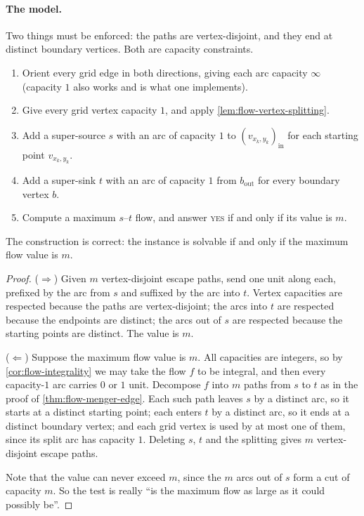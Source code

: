 \paragraph{The model.}
Two things must be enforced: the paths are vertex-disjoint, and they end at
distinct boundary vertices. Both are capacity constraints.

\begin{enumerate}[leftmargin=*]
  \item Orient every grid edge in both directions, giving each arc capacity
        $\infty$ (capacity $1$ also works and is what one implements).
  \item Give every grid vertex capacity $1$, and apply
        \cref{lem:flow-vertex-splitting}.
  \item Add a super-source $s$ with an arc of capacity $1$ to
        $(v_{x_k,y_k})_{\mathrm{in}}$ for each starting point $v_{x_k,y_k}$.
  \item Add a super-sink $t$ with an arc of capacity $1$ from
        $b_{\mathrm{out}}$ for every boundary vertex $b$.
  \item Compute a maximum $s$--$t$ flow, and answer \textsc{yes} if and only if
        its value is $m$.
\end{enumerate}

\begin{theorem}\label{thm:flow-grid-escape}
The construction is correct: the instance is solvable if and only if the
maximum flow value is $m$.
\end{theorem}

\begin{proof}
($\Rightarrow$) Given $m$ vertex-disjoint escape paths, send one unit along
each, prefixed by the arc from $s$ and suffixed by the arc into $t$. Vertex
capacities are respected because the paths are vertex-disjoint; the arcs into
$t$ are respected because the endpoints are distinct; the arcs out of $s$ are
respected because the starting points are distinct. The value is $m$.

($\Leftarrow$) Suppose the maximum flow value is $m$. All capacities are
integers, so by \cref{cor:flow-integrality} we may take the flow $f$ to be
integral, and then every capacity-$1$ arc carries $0$ or $1$ unit. Decompose
$f$ into $m$ paths from $s$ to $t$ as in the proof of
\cref{thm:flow-menger-edge}. Each such path leaves $s$ by a distinct arc, so it
starts at a distinct starting point; each enters $t$ by a distinct arc, so it
ends at a distinct boundary vertex; and each grid vertex is used by at most one
of them, since its split arc has capacity $1$. Deleting $s$, $t$ and the
splitting gives $m$ vertex-disjoint escape paths.

Note that the value can never exceed $m$, since the $m$ arcs out of $s$ form a
cut of capacity $m$. So the test is really ``is the maximum flow as large as it
could possibly be''.
\end{proof}

